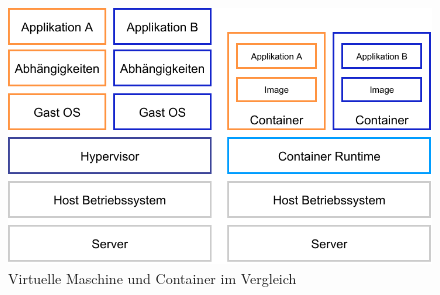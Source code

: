 \begin{figure}[hb]
	\centering
	\includegraphics[width=1\linewidth]{gfx/vm_container.pdf}
	\caption{Virtuelle Maschine und Container im Vergleich}
	\label{fig:vmcontainer}
\end{figure}


